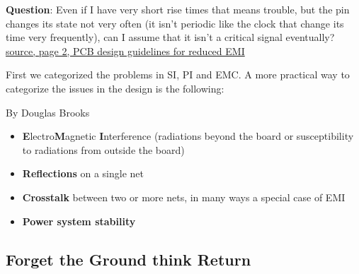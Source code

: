 \documentclass[12pt]{article}
\begin{document}
\textbf{Question}: Even if I have very short rise times that means trouble, but the pin changes its state not very often (it isn't periodic like the clock that change its time very frequently), can I assume that it isn't a critical signal eventually? \href{https://www.ti.com/lit/an/szza009/szza009.pdf}{source, page 2, PCB design guidelines for reduced EMI}

First we categorized the problems in SI, PI and EMC. A more practical way to categorize the issues in the design is the following:



By Douglas Brooks

\begin{itemize}
    \item \textbf{E}lectro\textbf{M}agnetic \textbf{I}nterference (radiations beyond the board or susceptibility to radiations from outside the board)
    \item \textbf{Reflections} on a single net
	\item \textbf{Crosstalk} between two or more nets, in many ways a special case of EMI
	\item \textbf{Power system stability} 
\end{itemize}

\subsection{Forget the Ground think Return}

\end{document}
